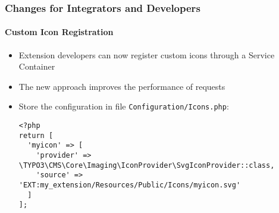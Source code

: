 %

\begin{frame}[fragile]
	\frametitle{Changes for Integrators and Developers}
	\framesubtitle{Custom Icon Registration}


	\begin{itemize}
		\item Extension developers can now register custom icons through a Service Container
		\item The new approach improves the performance of requests
		\item Store the configuration in file \texttt{Configuration/Icons.php}:
\begin{lstlisting}
<?php
return [
  'myicon' => [
    'provider' => \TYPO3\CMS\Core\Imaging\IconProvider\SvgIconProvider::class,
    'source' => 'EXT:my_extension/Resources/Public/Icons/myicon.svg'
  ]
];
\end{lstlisting}

	\end{itemize}

\end{frame}

